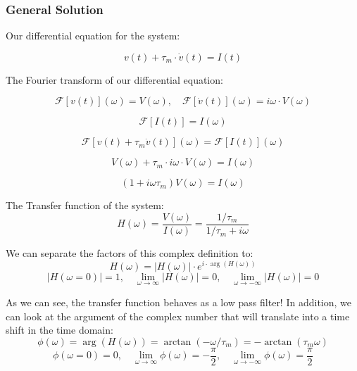 \subsubsection{General Solution}

Our differential equation for the system:

\begin{equation}
    v(t) + \tau_m \cdot \dot{v}(t) = I(t)
\end{equation}

The Fourier transform of our differential equation:

\begin{equation}
    \mathcal{F}[v(t)](\omega) = V(\omega), \quad \mathcal{F}[\dot{v}(t)](\omega) = i\omega \cdot V(\omega)
\end{equation}

\begin{equation}
    \mathcal{F}[I(t)] = I(\omega)
\end{equation}

\begin{equation}
    \mathcal{F}[v(t) + \tau_m \dot{v}(t)](\omega) = \mathcal{F}[I(t)](\omega)
\end{equation}

\begin{equation}
    V(\omega) + \tau_m \cdot i \omega \cdot V(\omega) = I(\omega)
\end{equation}

\begin{equation}
(1 + i\omega \tau_m) V(\omega) = I(\omega)
\end{equation}

The Transfer function of the system:
\begin{equation}
H(\omega) = \frac{V(\omega)}{I(\omega)} = \frac{1/\tau_m}{1/\tau_m + i\omega}
\end{equation}

We can separate the factors of this complex definition to:
\begin{equation}
H(\omega) = |H(\omega)| \cdot e^{i \cdot \arg(H(\omega))}
\end{equation}
\begin{equation}
|H(\omega = 0)| = 1, \quad \lim_{\omega \to \infty} |H(\omega)| = 0, \quad \lim_{\omega \to -\infty} |H(\omega)| = 0
\end{equation}

As we can see, the transfer function behaves as a low pass filter!
In addition, we can look at the argument of the complex number that will translate into a time shift in the time domain:
\begin{equation}
\phi(\omega) = \arg(H(\omega)) = \arctan(-\omega/\tau_m) = -\arctan(\tau_m \omega)
\end{equation}
\begin{equation}
\phi(\omega = 0) = 0, \quad \lim_{\omega \to \infty} \phi(\omega) = -\frac{\pi}{2}, \quad \lim_{\omega \to -\infty} \phi(\omega) = \frac{\pi}{2}
\end{equation}

